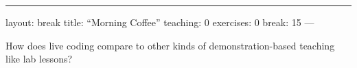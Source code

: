 \begin{center}
\rule{3in}{0.4pt}
\end{center}
layout: break
title: ``Morning Coffee''
teaching: 0
exercises: 0
break: 15
---

How does live coding compare to other kinds of demonstration-based teaching
like lab lessons?

